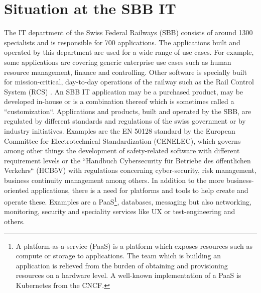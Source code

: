 \documentclass[a4paper,12pt]{article}
\begin{document}
    \section{Situation at the SBB IT}
    \label{sec:sbbit}
    The IT department of the Swiss Federal Railways (SBB) consists of around 1300 specialists and is responsible for
    700 applications\parencite{sbbitkennzahlen}.
    The applications built and operated by this department are used for a wide range of use cases.
    For example, some applications are covering generic enterprise use cases such as human resource management, finance
    and controlling.
    Other software is specially built for mission-critical, day-to-day operations of the railway such as the Rail Control
    System (RCS)\parencite{sbbrcs} .
    An SBB IT application may be a purchased product, may be developed in-house or is a combination thereof which is
    sometimes called a ``customization``.
    Applications and products, built and operated by the SBB, are regulated by different standards and regulations of the
    swiss government or by industry initiatives.
    Examples are the EN 50128 standard by the European Committee for Electrotechnical Standardization (CENELEC)\parencite{cenelec},
    which governs among other things the development of safety-related software with different requirement levels
    or the ``Handbuch Cybersecurity für Betriebe des öffentlichen Verkehrs`` (HCBöV)\parencite{hcboev} with regulations
    concerning cyber-security, risk management, business continuity management among others.
    In addition to the more business-oriented applications, there is a need for platforms and tools to help create
    and operate these.
    Examples are a PaaS\footnote{A platform-as-a-service (PaaS) is a platform which exposes resources such as compute or
    storage to applications. The team which is building an application is relieved from the burden of obtaining and
    provisioning resources on a hardware level. A well-known implementation of a PaaS is Kubernetes from the CNCF.},
    databases, messaging but also networking, monitoring, security and
    speciality services like UX or test-engineering and others.
\end{document}
